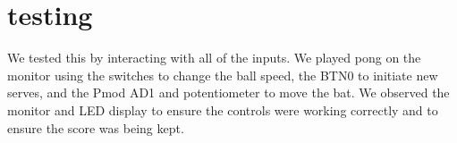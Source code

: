 \section{testing}
    We tested this by interacting with all of the inputs.  We played pong on the monitor using the switches to change the ball speed, the BTN0 to initiate new serves, and the Pmod AD1 and potentiometer to move the bat.  We observed the monitor and LED display to ensure the controls were working correctly and to ensure the score was being kept.

